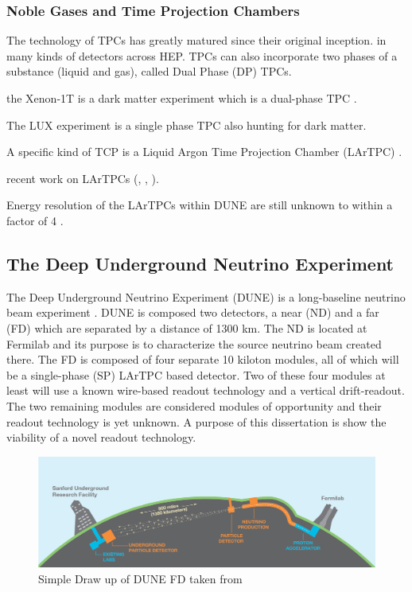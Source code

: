 \subsubsection{Noble Gases and Time Projection Chambers}

The technology of TPCs has greatly matured since their original inception.
in many kinds of detectors across HEP. TPCs can also incorporate two phases of a substance (liquid and gas), called Dual Phase (DP) TPCs.

the Xenon-1T is a dark matter experiment which is a dual-phase TPC \citep{Aprile_2017_xenon1T}.

The LUX experiment is a single phase TPC also hunting for dark matter.


A specific kind of TCP is a Liquid Argon Time Projection Chamber (LArTPC) \citep{rubbia1977liquid}.

recent work on LArTPCs (\citep{ArgoNeuT:PhysRevD.99.012002}, \citep{MicroBooNE:Acciarri_2017}, \citep{LArIAT:Acciarri_2020}).


Energy resolution of the LArTPCs within DUNE are still unknown to within a factor of 4 \citep{lartpc_energy_resolution:PhysRevD.99.036009}.



\subsection{The Deep Underground Neutrino Experiment}

The Deep Underground Neutrino Experiment (DUNE) is a long-baseline neutrino beam experiment \cite{DUNE_TDR_V1_Abi_2020, DUNE_FD_TDRv2_2020, DUNE_TDRv3_Abi_2020, DUNE-FD_TDRv4:Abi_2020}. 
DUNE is composed two detectors, a near (ND) and a far (FD) which are separated by a distance of 1300 km. 
The ND is located at Fermilab and its purpose is to characterize the source neutrino beam created there.
The FD is composed of four separate 10 kiloton modules, all of which will be a single-phase (SP) LArTPC based detector.
Two of these four modules at least will use a known wire-based readout technology and a vertical drift-readout.
The two remaining modules are considered modules of opportunity and their readout technology is yet unknown.
A purpose of this dissertation is show the viability of a novel readout technology.

\begin{figure}[]
\centering
\includegraphics[width=\textwidth]{images/LBNE_Graphic_061615_2016.jpg}
\caption{Simple Draw up of DUNE FD taken from \citep{dune_cdr_2016_arxiv}}
\end{figure}

